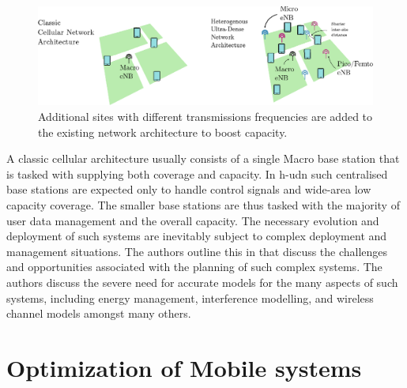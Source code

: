 \begin{figure}
    \centering
    \includegraphics{chapters/part_pathloss/figures/hudn_drawing.eps}
    \caption{Additional sites with different transmissions frequencies are added to the existing network architecture to boost capacity.}
    \label{fig:hudn_drawing}
\end{figure}


A classic cellular architecture usually consists of a single Macro base station that is tasked with supplying both coverage and capacity. In \gls{h-udn} such centralised base stations are expected only to handle control signals and wide-area low capacity coverage. The smaller base stations are thus tasked with the majority of user data management and the overall capacity. The necessary evolution and deployment of such systems are inevitably subject to complex deployment and management situations. The authors outline this in \cite{Taufique2017} that discuss the challenges and opportunities associated with the planning of such complex systems. The authors discuss the severe need for accurate models for the many aspects of such systems, including energy management, interference modelling, and wireless channel models amongst many others. 




\section{Optimization of Mobile systems}


